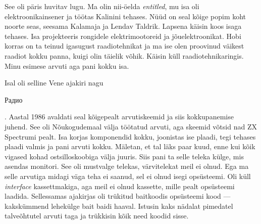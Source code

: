 

See oli päris huvitav lugu. Ma olin nii-öelda \emph{entitled}, mu isa oli
elektroonikainsener ja töötas Kalinini tehases. Nüüd on seal kõige popim koht noorte seas, seesama Kalamaja ja Lendav Taldrik.
Lapsena käisin koos isaga tehases. Isa projekteeris rongidele
elektrimootoreid ja jõuelektroonikat. 
Hobi korras on ta teinud igasugust raadiotehnikat ja ma ise olen proovinud
väikest raadiot kokku panna, kuigi olin täielik võhik. Käisin küll raadiotehnikaringis. Minu esimese arvuti aga pani kokku isa.


Isal oli selline Vene ajakiri nagu 
\begin{russian}Радио\end{russian}. Aastal 1986 avaldati seal 
kõigepealt arvutiskeemid ja siis kokkupanemise juhend. See oli 
Nõukogudemaal välja töötatud arvuti, aga skeemid võtsid nad ZX Spectrumi 
pealt. Isa korjas komponendid kokku, 
joonistas ise plaadi, tegi tehases plaadi valmis ja 
pani arvuti kokku. Mäletan, et tal läks paar kuud, enne kui kõik 
vigased kohad ostsilloskoobiga välja juuris. Siis pani ta selle 
teleka külge, mis asendas monitori. See oli mustvalge telekas, 
värvitelekat meil ei olnud. Ega ma selle arvutiga midagi väga teha ei 
saanud, sel ei olnud isegi opsüsteemi. Oli küll \emph{interface} 
kassettmakiga, aga meil ei olnud kassette, mille pealt 
opsüsteemi laadida. Sellessamas ajakirjas oli trükitud baitkoodis opsüsteemi kood --- 
kakskümmend lehekülge bait baidi haaval. Istusin kaks nädalat pimedatel talveõhtutel arvuti taga 
ja trükkisin kõik need koodid sisse.

